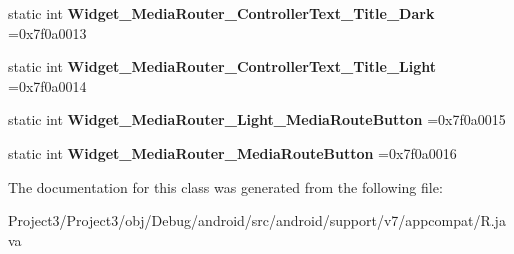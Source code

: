 \begin{DoxyCompactItemize}
\item 
\mbox{\label{classandroid_1_1support_1_1v7_1_1appcompat_1_1R_1_1style_a9e2906accd8b7118d2a34eea0adf4b27}} 
static int {\bfseries Widget\+\_\+\+Media\+Router\+\_\+\+Controller\+Text\+\_\+\+Title\+\_\+\+Dark} =0x7f0a0013
\item 
\mbox{\label{classandroid_1_1support_1_1v7_1_1appcompat_1_1R_1_1style_a25a4da9cbcfb0e14cd65c4e671ed59db}} 
static int {\bfseries Widget\+\_\+\+Media\+Router\+\_\+\+Controller\+Text\+\_\+\+Title\+\_\+\+Light} =0x7f0a0014
\item 
\mbox{\label{classandroid_1_1support_1_1v7_1_1appcompat_1_1R_1_1style_af2b6ab9a3bcf6c2389f7fda16b3e7c01}} 
static int {\bfseries Widget\+\_\+\+Media\+Router\+\_\+\+Light\+\_\+\+Media\+Route\+Button} =0x7f0a0015
\item 
\mbox{\label{classandroid_1_1support_1_1v7_1_1appcompat_1_1R_1_1style_a4dafbe883ddfe2e116d7a625e342e63d}} 
static int {\bfseries Widget\+\_\+\+Media\+Router\+\_\+\+Media\+Route\+Button} =0x7f0a0016
\end{DoxyCompactItemize}


The documentation for this class was generated from the following file\+:\begin{DoxyCompactItemize}
\item 
Project3/\+Project3/obj/\+Debug/android/src/android/support/v7/appcompat/R.\+java\end{DoxyCompactItemize}
